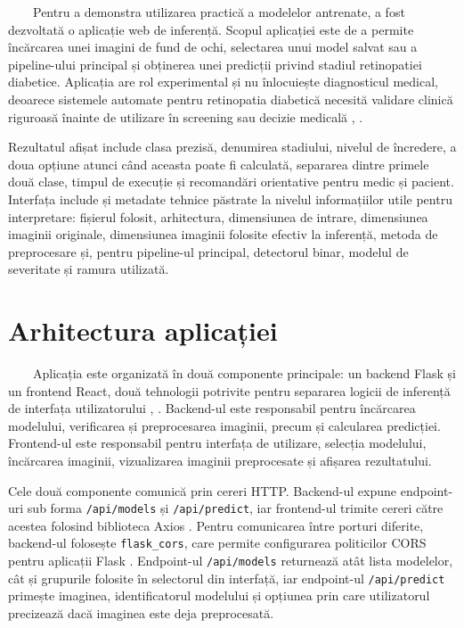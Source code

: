 \documentclass[12pt, a4paper, twoside, romanian]{teza-upb}
\begin{document}
\ \ \ \ Pentru a demonstra utilizarea practică a modelelor antrenate, a fost dezvoltată o
aplicație web de inferență. Scopul aplicației este de a permite încărcarea unei
imagini de fund de ochi, selectarea unui model salvat sau a pipeline-ului principal și obținerea unei
predicții privind stadiul retinopatiei diabetice. Aplicația are rol experimental și nu înlocuiește
diagnosticul medical, deoarece sistemele automate pentru retinopatia diabetică necesită validare
clinică riguroasă înainte de utilizare în screening sau decizie medicală \cite{3_gulshan2016development},
\cite{15_li2019diagnostic}.
\bigskip

Rezultatul afișat include clasa prezisă, denumirea stadiului, nivelul de încredere, a doua opțiune
atunci când aceasta poate fi calculată, separarea dintre primele două clase, timpul de execuție și
recomandări orientative pentru medic și pacient. Interfața include și metadate tehnice păstrate la
nivelul informațiilor utile pentru interpretare: fișierul folosit, arhitectura, dimensiunea de intrare,
dimensiunea imaginii originale, dimensiunea imaginii folosite efectiv la inferență, metoda de
preprocesare și, pentru pipeline-ul principal, detectorul binar, modelul de severitate și ramura
utilizată.

\section{Arhitectura aplicației}

\ \ \ \ Aplicația este organizată în două componente principale: un backend Flask și un
frontend React, două tehnologii potrivite pentru separarea logicii de inferență de interfața
utilizatorului \cite{flask_docs}, \cite{react_docs}. Backend-ul este responsabil pentru încărcarea modelului, verificarea și preprocesarea imaginii,
precum și calcularea predicției. Frontend-ul este responsabil pentru interfața de utilizare,
selecția modelului, încărcarea imaginii, vizualizarea imaginii preprocesate și afișarea rezultatului.
\bigskip

Cele două componente comunică prin cereri HTTP. Backend-ul expune endpoint-uri sub forma
\texttt{/api/models} și \texttt{/api/predict}, iar frontend-ul trimite cereri către acestea folosind biblioteca Axios
\cite{axios_docs}. Pentru comunicarea între porturi diferite, backend-ul folosește
\texttt{flask\_cors}, care permite configurarea politicilor CORS pentru aplicații Flask
\cite{flask_cors_docs}. Endpoint-ul \texttt{/api/models} returnează atât lista modelelor, cât și
grupurile folosite în selectorul din interfață, iar endpoint-ul \texttt{/api/predict} primește imaginea,
identificatorul modelului și opțiunea prin care utilizatorul precizează dacă imaginea este deja
preprocesată.
\end{document}
